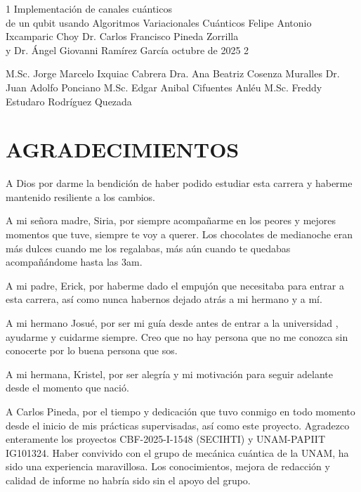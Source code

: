 \documentclass[letterpaper,12pt]{thesisECFM}
\theoremstyle{plain}
\theoremstyle{definition}
\theoremstyle{definition}
\theoremstyle{remark}
\newcommand{\1}{\mathbb{1}}
\begin{document}
\datosThesis%
{1}%
{Implementación de canales cuánticos \\ de un qubit usando Algoritmos Variacionales Cuánticos}%
{Felipe Antonio Ixcamparic Choy}%
{Dr. Carlos Francisco Pineda Zorrilla\\y Dr. Ángel Giovanni Ramírez García}%
{octubre de 2025}		%
{2}							%

\examenPrivado%
{M.Sc. Jorge Marcelo Ixquiac Cabrera}        %
{Dra. Ana Beatriz Cosenza Muralles}          %
{Dr. Juan Adolfo Ponciano}                   %
{M.Sc. Edgar Anibal Cifuentes Anléu}         %
{M.Sc. Freddy Estudaro Rodríguez Quezada}    %


\chapter*{AGRADECIMIENTOS}
A Dios por darme la bendición de haber podido estudiar esta carrera y haberme mantenido resiliente a los cambios. 
    
A mi señora madre, Siria,  por siempre acompañarme en los peores y mejores momentos que tuve, siempre te voy a querer. Los chocolates de medianoche eran más dulces cuando me los regalabas, más aún cuando te quedabas acompañándome hasta las 3am. 

A mi padre, Erick, por haberme dado el empujón que necesitaba para entrar a esta carrera, así como nunca habernos dejado atrás a mi hermano y a mí. 

A mi hermano Josué, por ser mi guía desde antes de entrar a la universidad , ayudarme y cuidarme siempre. Creo que no hay persona que no me conozca sin conocerte por lo buena persona que sos. 

A mi hermana, Kristel, por ser alegría y mi motivación para seguir adelante desde el momento que nació. 

A Carlos Pineda, por el tiempo y dedicación que tuvo conmigo en todo momento desde el inicio de mis prácticas supervisadas, así como este proyecto. Agradezco enteramente los proyectos CBF-2025-I-1548 (SECIHTI) y UNAM-PAPIIT IG101324. Haber convivido con el grupo de mecánica cuántica de la UNAM, ha sido una experiencia maravillosa. Los conocimientos, mejora de redacción y calidad de informe no habría sido sin el apoyo del grupo. 
\end{document}
